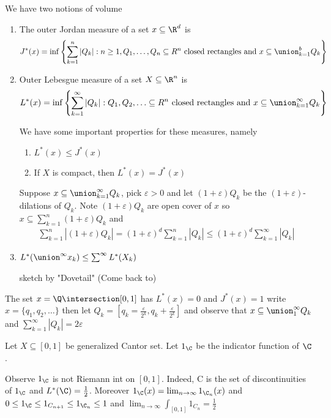 We have two notions of volume
\begin{enumerate}
	\item The outer Jordan measure of a set $x \subseteq \R^d$ is
			\[
				J^* (x)
				= \inf \left\{ \sum_{k=1}^{n} |Q_k| : n \geq 1, Q_1, \ldots, Q_n \subseteq R^n
					\text{ closed rectangles and }
				x \subseteq \union_{k=1}^{b} Q_k \right\}
			\]
	\item Outer Lebesgue measure of a set $X \subseteq \R^n$ is
		\begin{align*}
			L^*(x) = \inf \left\{ \sum_{k=1}^{\infty}|Q_k| : Q_1, Q_2, \ldots \subseteq R^n  \text{ closed rectangles and }
			x \subseteq \union_{k=1}^{\infty} Q_k \right\}
		\end{align*}

		We have some important properties for these measures, namely

		\begin{enumerate}
			\item $L^*(x) \leq J^* (x)$
			\item If  $X$ is compact, then $L^*(x) = J^*(x)$
		\end{enumerate}
		\begin{solution}
			Suppose $x \subseteq \union_{k=1}^{\infty} Q_k$, pick $\varepsilon > 0$ and let  $(1 + \varepsilon)Q_k$ be the $(1 + \varepsilon)$-dilations of $Q_k$. Note $(1+ \varepsilon ) Q_k$ are open cover of  $x$ so $x \subseteq \sum_{k=1}^n (1+\varepsilon) Q_k$ and
			\begin{align*}
				\sum_{k=1}^{n} |(1 + \varepsilon) Q_k| = (1+\varepsilon)^d \sum_{k=1}^{n}|Q_k| \leq (1 + \varepsilon)^d \sum_{k=1}^{\infty} | Q_k|
			\end{align*}
		\end{solution}

	\item $L^* (\union^{\infty} x_k ) \leq \sum_{}^{\infty} L^* (X_{k})$

		\begin{solution}
			sketch by "Dovetail" (Come back to)
		\end{solution}
\end{enumerate}

\begin{example}
	The set $x = \Q \intersection [0,1]$ has  $L^*(x) = 0$ and  $J^*(x) = 1$ write  $x = \{q_1, q_2, \ldots \}$ then let $Q_k = [q_k =  \frac{\varepsilon}{2^k}, q_k + \frac{\varepsilon}{2^k}]$
	and observe that $x \subseteq \union_{1}^{\infty} Q_k$ and $\sum_{k=1}^{\infty} |Q_k| = 2 \varepsilon$
\end{example}

\begin{example}
	Let $X \subseteq [0,1]$ be generalized Cantor set. Let $1_{\C}$ be the indicator function of $\C$.

	Observe $1_ {\C}$ is not Riemann int on $[0,1]$. Indeed, C is the set of discontinuities of $1_{\C}$ and $L^*(\C) = \frac{1}{2}$. Moreover $1_{\C}(x) = \lim_{n\to \infty} 1_{\C_n} (x)$ and
	$0 \leq 1_{\C} \leq 1_{C_{n+1}} \leq 1_{\C_{n}} \leq 1$ and
	$\lim_{n \to \infty} \int_{[0,1]} 1_{C_{n}} = \frac{1}{2} $
\end{example}
